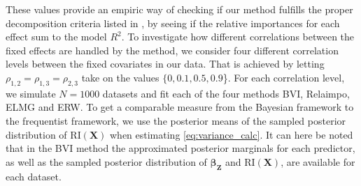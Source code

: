 These values provide an empiric way of checking if our method fulfills the proper decomposition criteria listed in , by seeing if the relative importances for each effect sum to the model $R^2$.
\newline
To investigate how different correlations between the fixed effects are handled by the method, we consider four different correlation levels between the fixed covariates in our data. That is achieved by letting $\rho_{1, 2} = \rho_{1, 3} = \rho_{2, 3}$ take on the values $\{0, 0.1, 0.5, 0.9$\}.
For each correlation level, we simulate $N=1000$ datasets and fit each of the four methods BVI, Relaimpo, ELMG and ERW.
To get a comparable measure from the Bayesian framework to the frequentist framework, we use the posterior means of the sampled posterior distribution of $\text{RI}(\mathbf{X})$ when estimating \eqref{eq:variance_calc}.
It can here be noted that in the BVI method the approximated posterior marginals for each predictor, as well as the sampled posterior distribution of $\boldsymbol{\beta}_{\mathbf{Z}}$ and $\text{RI}(\mathbf{X})$, are available for each dataset. 






